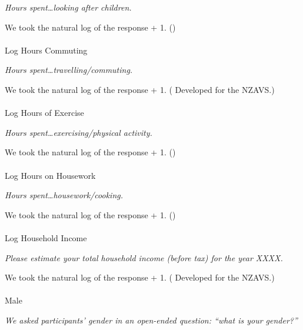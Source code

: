 \documentclass[
  single column]{article}
\makeatletter
\let\oldparagraph\paragraph
\renewcommand{\paragraph}{
    \@ifstar
      \xxxParagraphStar
      \xxxParagraphNoStar
  }
\newcommand{\xxxParagraphStar}[1]{\oldparagraph*{#1}\mbox{}}
\newcommand{\xxxParagraphNoStar}[1]{\oldparagraph{#1}\mbox{}}
\makeatother
\begin{document}
\emph{Hours spent\ldots looking after children.}

We took the natural log of the response + 1.
()

\paragraph{Log Hours Commuting}\label{log-hours-commuting}

\emph{Hours spent\ldots travelling/commuting.}

We took the natural log of the response + 1.
( Developed for the
NZAVS.)

\paragraph{Log Hours of Exercise}\label{log-hours-of-exercise}

\emph{Hours spent\ldots exercising/physical activity.}

We took the natural log of the response + 1.
()

\paragraph{Log Hours on Housework}\label{log-hours-on-housework}

\emph{Hours spent\ldots housework/cooking.}

We took the natural log of the response + 1.
()

\paragraph{Log Household Income}\label{log-household-income}

\emph{Please estimate your total household income (before tax) for the
year XXXX.}

We took the natural log of the response + 1.
( Developed for the
NZAVS.)

\paragraph{Male}\label{male}

\emph{We asked participants' gender in an open-ended question: ``what is
your gender?''}
\end{document}
